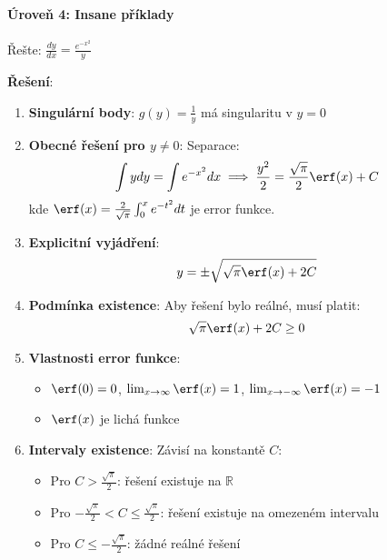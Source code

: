 \vspace{0.8\baselineskip}

\paragraph*{Úroveň 4: Insane příklady}

\begin{example}
    Řešte: $\frac{dy}{dx} = \frac{e^{-x^2}}{y}$
    
    \vspace{0.3\baselineskip}
    
    \textbf{Řešení}: 
    \begin{enumerate}
    \item \textbf{Singulární body}: $g(y) = \frac{1}{y}$ má singularitu v $y = 0$
    
    \item \textbf{Obecné řešení pro $y \neq 0$}: Separace:
    \[
    \int y  dy = \int e^{-x^2} dx \implies \frac{y^2}{2} = \frac{\sqrt{\pi}}{2} \erf(x) + C
    \]
    kde $\erf(x) = \frac{2}{\sqrt{\pi}} \int_0^x e^{-t^2} dt$ je error funkce.
    
    \item \textbf{Explicitní vyjádření}:
    \[
    y = \pm \sqrt{\sqrt{\pi} \erf(x) + 2C}
    \]
    
    \item \textbf{Podmínka existence}: Aby řešení bylo reálné, musí platit:
    \[
    \sqrt{\pi} \erf(x) + 2C \geq 0
    \]
    
    \item \textbf{Vlastnosti error funkce}: 
    \begin{itemize}
    \item $\erf(0) = 0$, $\lim_{x \to \infty} \erf(x) = 1$, $\lim_{x \to -\infty} \erf(x) = -1$
    \item $\erf(x)$ je lichá funkce
    \end{itemize}
    
    \item \textbf{Intervaly existence}: Závisí na konstantě $C$:
    \begin{itemize}
    \item Pro $C > \frac{\sqrt{\pi}}{2}$: řešení existuje na $\mathbb{R}$
    \item Pro $-\frac{\sqrt{\pi}}{2} < C \leq \frac{\sqrt{\pi}}{2}$: řešení existuje na omezeném intervalu
    \item Pro $C \leq -\frac{\sqrt{\pi}}{2}$: žádné reálné řešení
    \end{itemize}
    \end{enumerate}
    \end{example}


